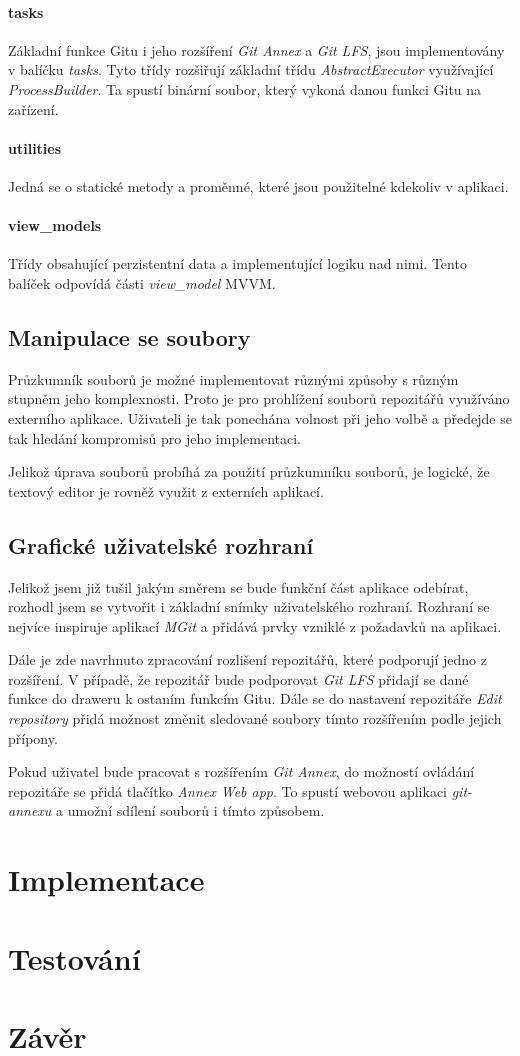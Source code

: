         \subsubsection{tasks}
        Základní funkce Gitu i jeho rozšíření \emph{Git Annex} a \emph{Git LFS}, jsou implementovány v balíčku \emph{tasks}. Tyto třídy rozšiřují základní třídu \emph{AbstractExecutor} využívající \emph{ProcessBuilder}. Ta spustí binární soubor, který vykoná danou funkci Gitu na zařízení.

        \subsubsection{utilities}
        Jedná se o statické metody a proměnné, které jsou použitelné kdekoliv v aplikaci. 

        \subsubsection{view\_models}
        Třídy obsahující perzistentní data a implementující logiku nad nimi. Tento balíček odpovídá části \emph{view\_model} MVVM.

    \newpage
    \section{Manipulace se soubory}
    Průzkumník souborů je možné implementovat různými způsoby s různým stupněm jeho komplexnosti. Proto je pro prohlížení souborů repozitářů využíváno externího aplikace. Uživateli je tak ponechána volnost při jeho volbě a předejde se tak hledání kompromisů pro jeho implementaci.

    Jelikož úprava souborů probíhá za použití průzkumníku souborů, je logické, že textový editor je rovněž využit z externích aplikací.

    \section{Grafické uživatelské rozhraní}
    Jelikož jsem již tušil jakým směrem se bude funkční část aplikace odebírat, rozhodl jsem se vytvořit i základní snímky uživatelského rozhraní. Rozhraní se nejvíce inspiruje aplikací \emph{MGit} a přidává prvky vzniklé z požadavků na aplikaci.

    Dále je zde navrhnuto zpracování rozlišení repozitářů, které podporují jedno z rozšíření. V případě, že repozitář bude podporovat \emph{Git LFS} přidají se dané funkce do draweru k ostaním funkcím Gitu. Dále se do nastavení repozitáře \emph{Edit repository} přidá možnost změnit sledované soubory tímto rozšířením podle jejich přípony.

    Pokud uživatel bude pracovat s rozšířením \emph{Git Annex}, do možností ovládání repozitáře se přidá tlačítko \emph{Annex Web app}. To spustí webovou aplikaci \emph{git-annexu} a umožní sdílení souborů i tímto způsobem.
\chapter{Implementace}
\chapter{Testování}
\chapter{Závěr}
